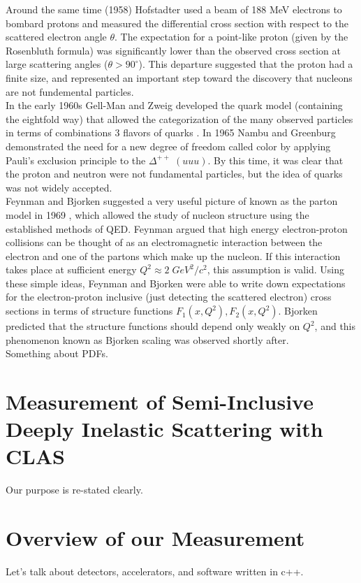 Around the same time (1958) Hofstadter used a beam of 188 MeV electrons to bombard protons and measured the differential cross section with respect to the scattered electron angle $\theta$.  The expectation for a point-like proton (given by the Rosenbluth formula) was significantly lower than the observed cross section at large scattering angles ($\theta > 90^\circ$).  This departure suggested that the proton had a finite size, and represented an important step toward the discovery that nucleons are not fundemental particles. \\

In the early 1960s Gell-Man and Zweig developed the quark model (containing the eightfold way) that allowed the categorization of the many observed particles in terms of combinations 3 flavors of quarks \cite{physics-zweig}.  In 1965 Nambu and Greenburg demonstrated the need for a new degree of freedom called color by applying Pauli's exclusion principle to the $\Delta^{++} \; (uuu)$.  By this time, it was clear that the proton and neutron were not fundamental particles, but the idea of quarks was not widely accepted.  \\

Feynman and Bjorken suggested a very useful picture of known as the parton model in 1969 \cite{physics-feynman-1969, physics-bjorken}, which allowed the study of nucleon structure using the established methods of QED.  Feynman argued that high energy electron-proton collisions can be thought of as an electromagnetic interaction between the electron and one of the partons which make up the nucleon.  If this interaction takes place at sufficient energy $Q^{2} \approx 2 \; GeV^2/c^2$, this assumption is valid.  Using these simple ideas, Feynman and Bjorken were able to write down expectations for the electron-proton inclusive (just detecting the scattered electron) cross sections in terms of structure functions $F_{1}(x, Q^2), F_{2}(x, Q^2)$.  Bjorken predicted that the structure functions should depend only weakly on $Q^2$, and this phenomenon known as Bjorken scaling was observed shortly after.  \\

Something about PDFs.

\section{Measurement of Semi-Inclusive Deeply Inelastic Scattering with CLAS}
Our purpose is re-stated clearly.

\section{Overview of our Measurement}
Let's talk about detectors, accelerators, and software written in c++. 

